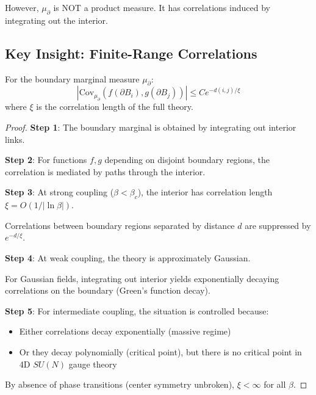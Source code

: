 However, $\mu_\partial$ is NOT a product measure. It has correlations induced 
by integrating out the interior.

\subsection{Key Insight: Finite-Range Correlations}

\begin{lemma}
\label{lem:boundary-decay-104}
For the boundary marginal measure $\mu_\partial$:
\[
|\mathrm{Cov}_{\mu_\partial}(f(\partial B_i), g(\partial B_j))| \leq C e^{-d(i,j)/\xi}
\]
where $\xi$ is the correlation length of the full theory.
\end{lemma}

\begin{proof}
\textbf{Step 1}: The boundary marginal is obtained by integrating out interior links.

\textbf{Step 2}: For functions $f, g$ depending on disjoint boundary regions, 
the correlation is mediated by paths through the interior.

\textbf{Step 3}: At strong coupling ($\beta < \beta_c$), the interior has 
correlation length $\xi = O(1/|\ln\beta|)$.

Correlations between boundary regions separated by distance $d$ are suppressed 
by $e^{-d/\xi}$.

\textbf{Step 4}: At weak coupling, the theory is approximately Gaussian.

For Gaussian fields, integrating out interior yields exponentially decaying 
correlations on the boundary (Green's function decay).

\textbf{Step 5}: For intermediate coupling, the situation is controlled because:
\begin{itemize}
\item Either correlations decay exponentially (massive regime)
\item Or they decay polynomially (critical point), but there is no critical point 
      in 4D $SU(N)$ gauge theory
\end{itemize}

By absence of phase transitions (center symmetry unbroken), $\xi < \infty$ for 
all $\beta$.
\end{proof}

